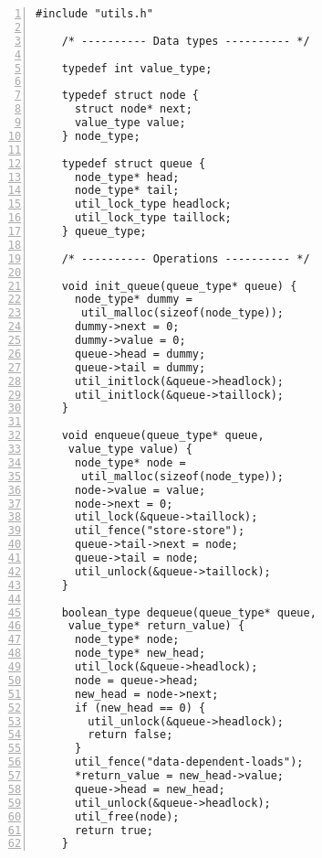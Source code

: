 \begin{Verbatim}[numbers=left]
    #include "utils.h"

    /* ---------- Data types ---------- */
    
    typedef int value_type;
    
    typedef struct node {
      struct node* next;
      value_type value;
    } node_type;
    
    typedef struct queue {
      node_type* head;
      node_type* tail;
      util_lock_type headlock;
      util_lock_type taillock;
    } queue_type;
    
    /* ---------- Operations ---------- */
    
    void init_queue(queue_type* queue) {
      node_type* dummy =
       util_malloc(sizeof(node_type));
      dummy->next = 0;
      dummy->value = 0;
      queue->head = dummy;
      queue->tail = dummy;
      util_initlock(&queue->headlock);
      util_initlock(&queue->taillock);
    }
    
    void enqueue(queue_type* queue,
     value_type value) {
      node_type* node =
       util_malloc(sizeof(node_type));
      node->value = value;
      node->next = 0;
      util_lock(&queue->taillock);
      util_fence("store-store");
      queue->tail->next = node;
      queue->tail = node;
      util_unlock(&queue->taillock);
    }
    
    boolean_type dequeue(queue_type* queue,
     value_type* return_value) {
      node_type* node;
      node_type* new_head;
      util_lock(&queue->headlock);
      node = queue->head;
      new_head = node->next;
      if (new_head == 0) {
        util_unlock(&queue->headlock);
        return false;
      }
      util_fence("data-dependent-loads");
      *return_value = new_head->value;
      queue->head = new_head;
      util_unlock(&queue->headlock);
      util_free(node);
      return true;
    }
\end{Verbatim}
